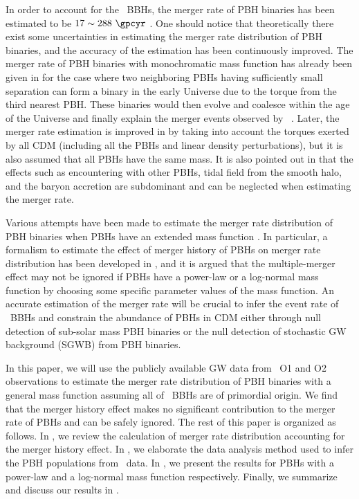 \documentclass[twocolumn]{aastex631}
\begin{document}
In order to account for the \lvc\ BBHs, the merger rate of PBH binaries has
been estimated to be $17 \sim 288~\gpcyr$ \cite{Chen:2018rzo}.
One should notice that theoretically there exist some uncertainties in
estimating the merger rate distribution of PBH binaries, and the accuracy of 
the estimation has been continuously improved.
The merger rate of PBH binaries with monochromatic mass function has already
been given in \cite{Nakamura:1997sm,Sasaki:2016jop} for the case where two 
neighboring PBHs having sufficiently small separation can form a binary in
the early Universe due to the torque from the third nearest PBH.
These binaries would then evolve and coalesce within the age of the Universe 
and finally explain the merger events observed by \lvc\
\cite{Sasaki:2016jop}.
Later, the merger rate estimation is improved in \cite{Ali-Haimoud:2017rtz} 
by taking into account the torques exerted by all CDM (including all the PBHs
and linear density perturbations), but it is also assumed that all PBHs have
the same mass.
It is also pointed out in \cite{Ali-Haimoud:2017rtz} that the effects such as
encountering with other PBHs, tidal field from the smooth halo, and
the baryon accretion are subdominant and can be neglected when estimating
the merger rate.

Various attempts have been made to estimate the merger rate distribution
of PBH binaries when PBHs have an extended mass function 
\cite{Chen:2018czv,Chen:2018rzo,Raidal:2018bbj,Raidal:2017mfl,Liu:2018ess,Liu:2020cds,Vaskonen:2019jpv}.
In particular, a formalism to estimate the effect of merger history of PBHs
on merger rate distribution has been developed in \cite{Liu:2019rnx},
and it is argued that the multiple-merger effect may not be ignored if
PBHs have a power-law or a log-normal mass function by choosing some specific
parameter values of the mass function.
An accurate estimation of the merger rate will be crucial to infer the event
rate of \lvc\ BBHs and constrain the abundance of PBHs in CDM either through
null detection of sub-solar mass PBH binaries or the null detection
of stochastic GW background (SGWB) from PBH binaries.

In this paper, we will use the publicly available GW data from \lvc\ O1 and O2 
observations to estimate the merger rate distribution of PBH binaries with a
general mass function assuming all of \lvc\ BBHs are of primordial origin.
We find that the merger history effect makes no significant contribution to
the merger rate of PBHs and can be safely ignored.
The rest of this paper is organized as follows.
In , we review the calculation of merger rate distribution 
accounting for the merger history effect.
In , we elaborate the data analysis method used to infer the
PBH populations from \lvc\ data.
In , we present the results for PBHs with a power-law and 
a log-normal mass function respectively.
Finally, we summarize and discuss our results in .
\end{document}
